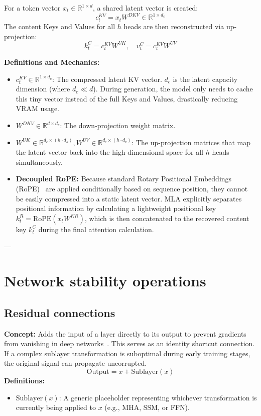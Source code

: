 \documentclass[11pt]{article}
\begin{document}
	For a token vector $x_t \in \mathbb{R}^{1 \times d}$, a shared latent vector is created:
	\begin{equation}
		c_t^{KV} = x_t W^{DKV} \in \mathbb{R}^{1 \times d_c}
	\end{equation}
	The content Keys and Values for all $h$ heads are then reconstructed via up-projection:
	\begin{equation}
		k_t^C = c_t^{KV} W^{UK}, \quad v_t^C = c_t^{KV} W^{UV}
	\end{equation}
	
	\textbf{Definitions and Mechanics:}
	\begin{itemize}
		\item $c_t^{KV} \in \mathbb{R}^{1 \times d_c}$: The compressed latent KV vector. $d_c$ is the latent capacity dimension (where $d_c \ll d$). During generation, the model only needs to cache this tiny vector instead of the full Keys and Values, drastically reducing VRAM usage.
		\item $W^{DKV} \in \mathbb{R}^{d \times d_c}$: The down-projection weight matrix.
		\item $W^{UK} \in \mathbb{R}^{d_c \times (h \cdot d_k)}, W^{UV} \in \mathbb{R}^{d_c \times (h \cdot d_v)}$: The up-projection matrices that map the latent vector back into the high-dimensional space for all $h$ heads simultaneously.
		\item \textbf{Decoupled RoPE:} Because standard Rotary Positional Embeddings (RoPE)~\cite{su2021roformer} are applied conditionally based on sequence position, they cannot be easily compressed into a static latent vector. MLA explicitly separates positional information by calculating a lightweight positional key $k_t^R = \text{RoPE}(x_t W^{KR})$, which is then concatenated to the recovered content key $k_t^C$ during the final attention calculation.
	\end{itemize}
	
	---
	
	\section{Network stability operations}
	
	\subsection{Residual connections}
	\textbf{Concept:} Adds the input of a layer directly to its output to prevent gradients from vanishing in deep networks~\cite{he2015resnet}. This serves as an identity shortcut connection. If a complex sublayer transformation is suboptimal during early training stages, the original signal can propagate uncorrupted.
	\begin{equation}
		\text{Output} = x + \text{Sublayer}(x)
	\end{equation}
	\textbf{Definitions:}
	\begin{itemize}
		\item $\text{Sublayer}(x)$: A generic placeholder representing whichever transformation is currently being applied to $x$ (e.g., MHA, SSM, or FFN).
	\end{itemize}
	
\end{document}
